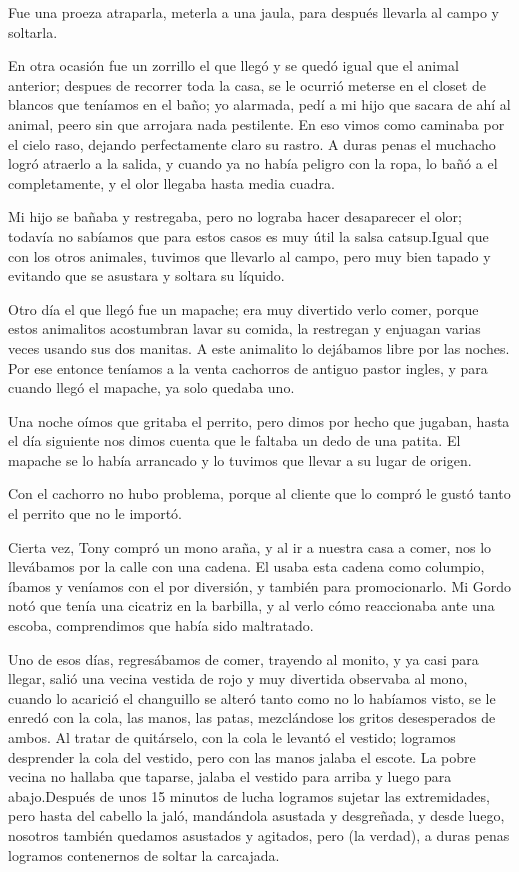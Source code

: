 \documentclass[letterpaper, 12pt]{book}
\begin{document}
Fue una proeza atraparla, meterla a una jaula, para después llevarla al campo y soltarla.

En otra ocasión fue un zorrillo el que llegó y se quedó igual que el animal anterior; despues de recorrer toda la casa, se le ocurrió meterse en el closet de blancos que teníamos en el baño; yo alarmada, pedí a mi hijo que sacara de ahí al animal, peero sin que arrojara nada pestilente. En eso vimos como caminaba por el cielo raso, dejando perfectamente claro su rastro. A duras penas el muchacho logró atraerlo a la salida, y cuando ya no había peligro con la ropa, lo bañó a el completamente, y el olor llegaba hasta media cuadra.

Mi hijo se bañaba y restregaba, pero no lograba hacer desaparecer el olor; todavía no sabíamos que para estos casos es muy útil la salsa catsup.Igual que con los otros animales, tuvimos que llevarlo al campo, pero muy bien tapado y evitando que se asustara y soltara su líquido. 

Otro día el que llegó fue un mapache; era muy divertido verlo comer, porque estos animalitos acostumbran lavar su comida, la restregan y enjuagan varias veces usando sus dos manitas. A este animalito lo dejábamos libre por las noches. Por ese entonce teníamos a la venta cachorros de antiguo pastor ingles, y para cuando llegó el mapache, ya solo quedaba uno.

Una noche oímos que gritaba el perrito, pero dimos por hecho que jugaban, hasta el día siguiente nos dimos cuenta que le faltaba un dedo de una patita. El mapache se lo había arrancado y lo tuvimos que llevar a su lugar de origen.

Con el cachorro no hubo problema, porque al cliente que lo compró le gustó tanto el perrito que no le importó.

Cierta vez, Tony compró un mono araña, y al ir a nuestra casa a comer, nos lo llevábamos por la calle con una cadena. El usaba esta cadena como columpio, íbamos y veníamos con el por diversión, y también para promocionarlo. Mi Gordo notó que tenía una cicatriz en la barbilla, y al verlo cómo reaccionaba ante una escoba, comprendimos que había sido maltratado.

Uno de esos días, regresábamos de comer, trayendo al monito, y ya casi para llegar, salió una vecina vestida de rojo y muy divertida observaba al mono, cuando lo acarició el changuillo se alteró tanto como no lo habíamos visto, se le enredó con la cola, las manos, las patas, mezclándose los gritos desesperados de ambos. Al tratar de quitárselo, con la cola le levantó el vestido; logramos desprender la cola del vestido, pero con las manos jalaba el escote. La pobre vecina no hallaba que taparse, jalaba el vestido para arriba y luego para abajo.Después de unos 15 minutos de lucha logramos sujetar las extremidades, pero hasta del cabello la jaló, mandándola asustada y desgreñada, y desde luego, nosotros también quedamos asustados y agitados, pero (la verdad), a duras penas logramos contenernos de soltar la carcajada.
\end{document}
